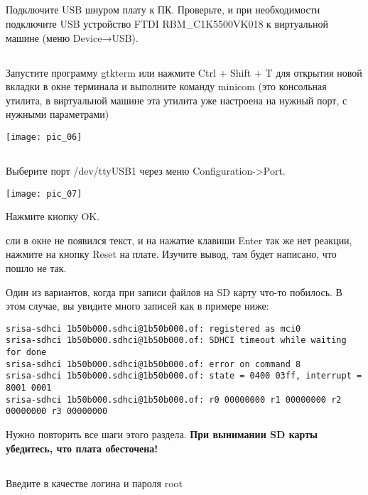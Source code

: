 \subsection{}Подключите USB шнуром плату к ПК. Проверьте, и при необходимости подключите USB устройство FTDI RBM\_C1K5500VK018 к виртуальной машине (меню Device→USB).

\subsection{} Запустите программу gtkterm или нажмите Ctrl + Shift + T для открытия новой вкладки в окне терминала и выполните команду minicom (это консольная утилита, в виртуальной машине эта утилита уже настроена на нужный порт, с нужными параметрами)
\begin{center}
	\texttt{[image: pic\_06]}
\end{center}

\subsection{} Выберите порт  /dev/ttyUSB1 через меню Configuration->Port.
\begin{center}
	\texttt{[image: pic\_07]}
\end{center}

Нажмите кнопку OK.

сли в окне не появился текст, и на нажатие клавиши Enter так же нет реакции,  нажмите на кнопку Reset на плате. Изучите вывод, там будет написано, что пошло не так.

Один из вариантов, когда при записи файлов на SD карту что-то побилось. В этом случае, вы увидите много записей как в примере ниже:
\begin{lstlisting}[style=stdout]
srisa-sdhci 1b50b000.sdhci@1b50b000.of: registered as mci0
srisa-sdhci 1b50b000.sdhci@1b50b000.of: SDHCI timeout while waiting for done
srisa-sdhci 1b50b000.sdhci@1b50b000.of: error on command 8
srisa-sdhci 1b50b000.sdhci@1b50b000.of: state = 0400 03ff, interrupt = 8001 0001
srisa-sdhci 1b50b000.sdhci@1b50b000.of: r0 00000000 r1 00000000 r2 00000000 r3 00000000
\end{lstlisting}

Нужно повторить все шаги этого раздела. \textbf{При вынимании SD карты убедитесь, что плата обесточена!}

\subsection{} Введите в качестве логина и пароля root

